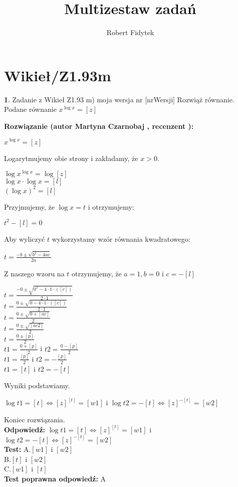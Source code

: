 \documentclass[12pt, a4paper]{article}
\title{Multizestaw zadań}
\author{Robert Fidytek}
\date{}
\theoremstyle{definition} %
\newtheorem{zad}{}
\newcommand{\kategoria}[1]{\section{#1}} %
\newcommand{\zadStart}[1]{\begin{zad}#1\newline} %
\newcommand{\zadStop}{\end{zad}}   %
\newcommand{\rozwStart}[2]{\noindent \textbf{Rozwiązanie (autor #1 , recenzent #2): }\newline} %
\newcommand{\rozwStop}{\newline}                                            %
\newcommand{\odpStart}{\noindent \textbf{Odpowiedź:}\newline}    %
\newcommand{\odpStop}{\newline}                                             %
\newcommand{\testStart}{\noindent \textbf{Test:}\newline} %
\newcommand{\testStop}{\newline} %
\newcommand{\kluczStart}{\noindent \textbf{Test poprawna odpowiedź:}\newline} %
\newcommand{\kluczStop}{\newline} %
\begin{document}
\maketitle


\kategoria{Wikieł/Z1.93m}
\zadStart{Zadanie z Wikieł Z1.93 m) moja wersja nr [nrWersji]}
Rozwiąż równanie.\\
Podane równanie $ x^{\log x} = [z] $\\
\zadStop
\rozwStart{Martyna Czarnobaj}{}
\begin{center}
	$ x^{\log x} = [z] $\\
\end{center}
	Logarytmujemy obie strony i zakładamy, że $ x>0 $.\\
\begin{center}
	$ \log x^{\log x} = \log [z] $\\
	$ \log x \cdot \log x = [l] $\\
	$ (\log x)^{2}=[l] $\\
\end{center}
Przyjmujemy, że $ \log x = t $ i otrzymujemy:\\
\begin{center}
$ t^{2} - [l] = 0 $\\	 
\end{center}
Aby wyliczyć $ t $ wykorzystamy wzór równania kwadratowego:\\
\begin{center}
	$ t = \frac{-b \pm \sqrt{b^{2} - 4ac}}{2a} $
\end{center}
Z naszego wzoru na $ t $ otrzymujemy, że $ a = 1, b = 0$ i $c = -[l] $\\
\begin{center}
	$ t = \frac{-0 \pm \sqrt{0^{2}-4 \cdot 1 \cdot ([c])}}{2 \cdot 1} $\\
	$ t = \frac{0 \pm \sqrt{0-4 \cdot 1 \cdot ([c])}}{2 \cdot 1} $\\
	$ t = \frac{0 \pm \sqrt{0+[ac]}}{2} $\\
	$ t = \frac{0 \pm \sqrt{[ac2]}}{2} $\\
	$ t = \frac{0 \pm [p]}{2} $\\
	$ t1 = \frac{0 + [p]}{2} $ i $ t2 = \frac{0 - [p]}{2} $\\
	$ t1 = \frac{[p]}{2} $ i $ t2 = -\frac{[p]}{2} $\\
	$ t1 = [t] $ i $ t2 = -[t] $\\
\end{center}
Wyniki podstawiamy.
\begin{center}
	$ \log t1  = [t] \iff [z]^{[t]}=[w1] $ i $ \log t2 = -[t] \iff [z]^{-[t]}=[w2]$\\
\end{center}
Koniec rozwiązania.\\
\rozwStop
\odpStart
$ \log t1  = [t] \iff [z]^{[t]}=[w1] $ i $ \log t2 = -[t] 
\iff [z]^{-[t]}=[w2]$\\
\odpStop
\testStart
A.$ [w1] $ i $ [w2]$\\
B.$ [t] $ i $ [w2]$\\
C.$ [w1] $ i $ [t]$\\
\testStop
\kluczStart
A
\kluczStop
\end{document}
